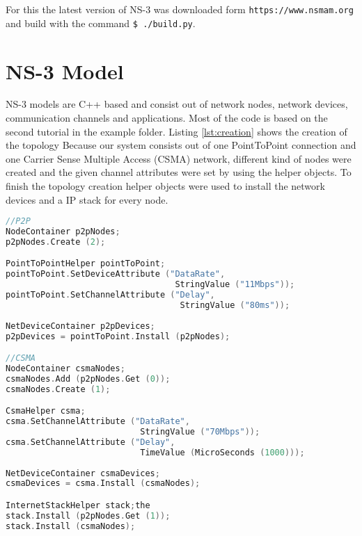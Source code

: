 \documentclass[parskip=full]{scrartcl}
\begin{document}
For this the latest version of NS-3 was downloaded form \verb|https://www.nsmam.org| and build with the command \verb|$ ./build.py|. 


\section{NS-3 Model} \label{sec:procedure}
NS-3 models are C++ based and consist out of network nodes, network devices, communication channels and applications.
Most of the code is based on the second tutorial in the example folder.
Listing \ref{lst:creation} shows the creation of the topology
Because our system consists out of one PointToPoint connection and one Carrier Sense Multiple Access (CSMA) network, different kind of nodes were created and the given channel attributes were set by using the helper objects.
To finish the topology creation helper objects were used to install the network devices and a IP stack for every node.

\begin{lstlisting}[language=c++, frame=single, captionpos=b, caption={Topology creation}, label=lst:creation]
//P2P
NodeContainer p2pNodes;
p2pNodes.Create (2);

PointToPointHelper pointToPoint;
pointToPoint.SetDeviceAttribute ("DataRate", 
                                  StringValue ("11Mbps"));
pointToPoint.SetChannelAttribute ("Delay", 
                                   StringValue ("80ms"));
                                   
NetDeviceContainer p2pDevices;
p2pDevices = pointToPoint.Install (p2pNodes);

//CSMA
NodeContainer csmaNodes;
csmaNodes.Add (p2pNodes.Get (0));
csmaNodes.Create (1);

CsmaHelper csma;
csma.SetChannelAttribute ("DataRate", 
                           StringValue ("70Mbps"));
csma.SetChannelAttribute ("Delay", 
                           TimeValue (MicroSeconds (1000)));
                           
NetDeviceContainer csmaDevices;
csmaDevices = csma.Install (csmaNodes);

InternetStackHelper stack;the
stack.Install (p2pNodes.Get (1));
stack.Install (csmaNodes);
\end{lstlisting}
\end{document}

